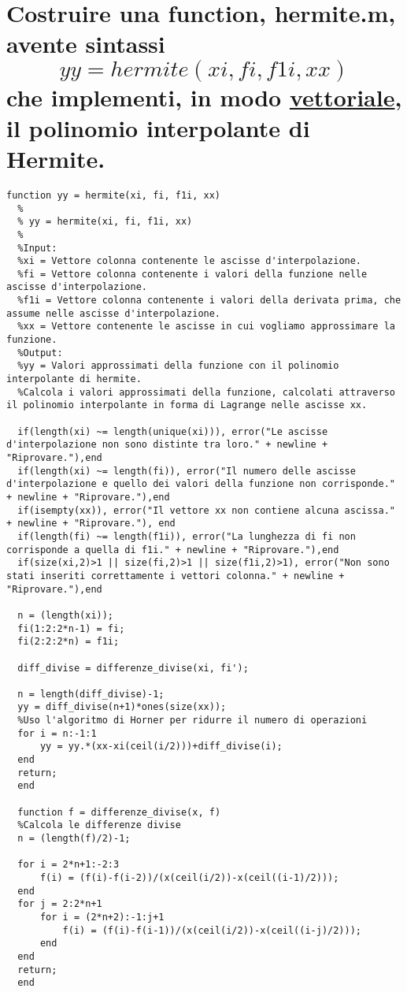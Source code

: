 \documentclass[10pt,a4paper]{article}
\begin{document}
\section{
  Costruire una function, \textbf{hermite.m}, avente sintassi
  $$ yy = hermite( xi, fi, f1i, xx) $$
  che implementi, in modo \underline{vettoriale}, il polinomio interpolante di Hermite.
 }
\begin{lstlisting}[style=Matlab-editor]
  function yy = hermite(xi, fi, f1i, xx)
  % 
  % yy = hermite(xi, fi, f1i, xx)
  %
  %Input:
  %xi = Vettore colonna contenente le ascisse d'interpolazione.
  %fi = Vettore colonna contenente i valori della funzione nelle ascisse d'interpolazione.
  %f1i = Vettore colonna contenente i valori della derivata prima, che assume nelle ascisse d'interpolazione.
  %xx = Vettore contenente le ascisse in cui vogliamo approssimare la funzione.
  %Output:
  %yy = Valori approssimati della funzione con il polinomio interpolante di hermite.
  %Calcola i valori approssimati della funzione, calcolati attraverso il polinomio interpolante in forma di Lagrange nelle ascisse xx.
  
  if(length(xi) ~= length(unique(xi))), error("Le ascisse d'interpolazione non sono distinte tra loro." + newline + "Riprovare."),end 
  if(length(xi) ~= length(fi)), error("Il numero delle ascisse d'interpolazione e quello dei valori della funzione non corrisponde." + newline + "Riprovare."),end
  if(isempty(xx)), error("Il vettore xx non contiene alcuna ascissa." + newline + "Riprovare."), end  
  if(length(fi) ~= length(f1i)), error("La lunghezza di fi non corrisponde a quella di f1i." + newline + "Riprovare."),end
  if(size(xi,2)>1 || size(fi,2)>1 || size(f1i,2)>1), error("Non sono stati inseriti correttamente i vettori colonna." + newline + "Riprovare."),end
  
  n = (length(xi));
  fi(1:2:2*n-1) = fi;
  fi(2:2:2*n) = f1i;
  
  diff_divise = differenze_divise(xi, fi');
    
  n = length(diff_divise)-1;
  yy = diff_divise(n+1)*ones(size(xx));    
  %Uso l'algoritmo di Horner per ridurre il numero di operazioni
  for i = n:-1:1
      yy = yy.*(xx-xi(ceil(i/2)))+diff_divise(i);
  end
  return;
  end
    
  function f = differenze_divise(x, f)
  %Calcola le differenze divise
  n = (length(f)/2)-1;
  
  for i = 2*n+1:-2:3
      f(i) = (f(i)-f(i-2))/(x(ceil(i/2))-x(ceil((i-1)/2)));
  end
  for j = 2:2*n+1
      for i = (2*n+2):-1:j+1
          f(i) = (f(i)-f(i-1))/(x(ceil(i/2))-x(ceil((i-j)/2)));
      end
  end
  return;
  end
\end{lstlisting}
\end{document}

